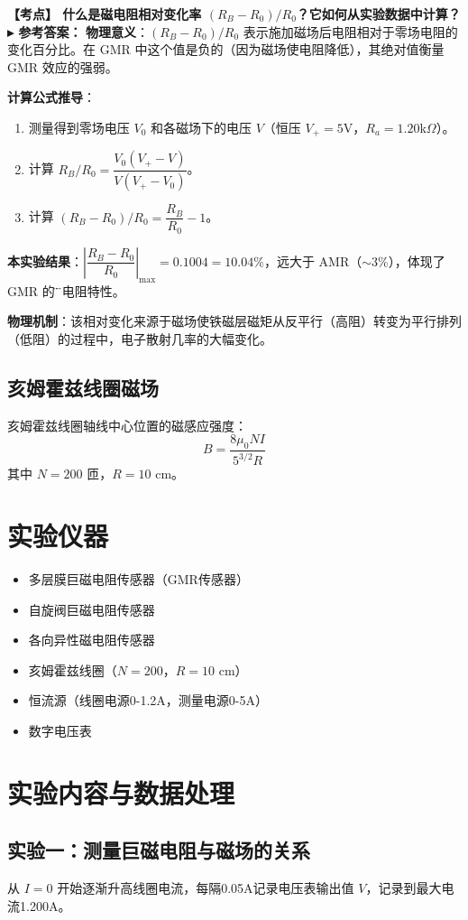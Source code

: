 \documentclass[12pt,a4paper]{article}
\newcommand{\boxeq}[1]{\begin{equation}\boxed{#1}\end{equation}}
\newcommand{\exam}[1]{\textbf{\color{blue!70!black}【考点】#1}}
\newcommand{\answer}[1]{\vspace{2pt}\noindent\textbf{\color{teal!80!black}▸ 参考答案：}#1\vspace{4pt}}
\newcommand{\qa}[2]{\exam{#1}\answer{#2}}
\begin{document}
\qa{
    什么是磁电阻相对变化率 $(R_B-R_0)/R_0$？它如何从实验数据中计算？
}{
    \textbf{物理意义}：$(R_B-R_0)/R_0$ 表示施加磁场后电阻相对于零场电阻的变化百分比。在 GMR 中这个值是负的（因为磁场使电阻降低），其绝对值衡量 GMR 效应的强弱。

    \textbf{计算公式推导}：
    \begin{enumerate}
        \item 测量得到零场电压 $V_0$ 和各磁场下的电压 $V$（恒压 $V_+=5$V，$R_a=1.20$k$\Omega$）。
        \item 计算 $R_B/R_0 = \dfrac{V_0(V_+ - V)}{V(V_+ - V_0)}$。
        \item 计算 $(R_B-R_0)/R_0 = \dfrac{R_B}{R_0} - 1$。
    \end{enumerate}

    \textbf{本实验结果}：$\left|\dfrac{R_B-R_0}{R_0}\right|_{\max} = 0.1004 = 10.04\%$，远大于 AMR（$\sim 3\%$），体现了 GMR 的\"巨\"磁电阻特性。

    \textbf{物理机制}：该相对变化来源于磁场使铁磁层磁矩从反平行（高阻）转变为平行排列（低阻）的过程中，电子散射几率的大幅变化。
}

\subsection{亥姆霍兹线圈磁场}
亥姆霍兹线圈轴线中心位置的磁感应强度：
\boxeq{B = \frac{8\mu_0 N I}{5^{3/2} R}}
其中 \(N=200\) 匝，\(R=10\) cm。

\section{实验仪器}
\begin{itemize}
    \item 多层膜巨磁电阻传感器（GMR传感器）
    \item 自旋阀巨磁电阻传感器
    \item 各向异性磁电阻传感器
    \item 亥姆霍兹线圈（\(N=200\)，\(R=10\) cm）
    \item 恒流源（线圈电源0-1.2A，测量电源0-5A）
    \item 数字电压表
\end{itemize}

\section{实验内容与数据处理}

\subsection{实验一：测量巨磁电阻与磁场的关系}
从 \(I=0\) 开始逐渐升高线圈电流，每隔0.05A记录电压表输出值 \(V\)，记录到最大电流1.200A。
\end{document}
